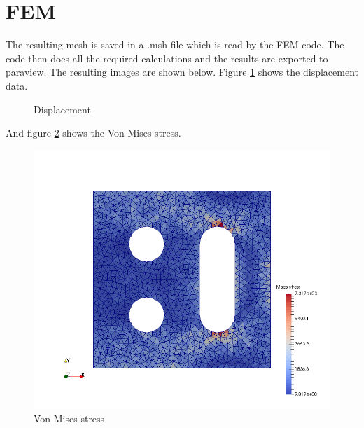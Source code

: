 \section{FEM}
The resulting mesh is saved in a .msh file which is read by the FEM code. The code then does all the required calculations and the results are exported to paraview. The resulting images are shown below. Figure \ref{Disp} shows the displacement data. 

 \begin{figure}[H]
 	\begin{center}
    \caption{Displacement}
    \label{Disp}
	\end{center}
\end{figure}

And figure \ref{VonMises} shows the Von Mises stress.

\begin{figure}[H]
    \begin{center}
    \includegraphics[scale=0.6]{IMG/smile_mises.png}
    \caption{Von Mises stress}
    \label{VonMises}
    \end{center}
\end{figure}